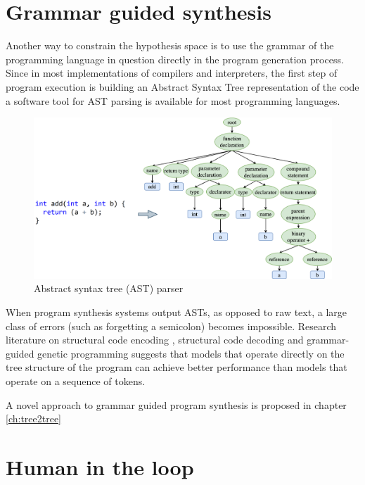 \newpage
\section{Grammar guided synthesis}
\label{sec:grammar-guided}

Another way to constrain the hypothesis space is to use the grammar of the programming language in question directly in the program generation process.
Since in most implementations of compilers and interpreters, the first step of program execution is building an Abstract Syntax Tree representation of the code a software tool for AST parsing is available for most programming languages.

\begin{figure}[H]
    \centering
    \includegraphics[width=\linewidth]{images/ast.png}
    \caption{Abstract syntax tree (AST) parser}
    \label{fig:ast-parser}
\end{figure}

When program synthesis systems  output ASTs, as opposed to raw text, a large class of errors (such as forgetting a semicolon) becomes impossible. 
Research literature on structural code encoding \cite{alon2019structural,zhang2015tree}, structural code decoding \cite{jiang2021ast,zhu2019grammarcnn} and grammar-guided genetic programming \cite{bunelLeveragingGrammarReinforcement2018, manriqueGrammarguidedGeneticProgramming2009, sobaniaChallengesProgramSynthesis2020a} suggests that models that operate directly on the tree structure of the program can achieve better performance than models that operate on a sequence of tokens.

A novel approach to grammar guided program synthesis is proposed in chapter \ref{ch:tree2tree}

\newpage
\section{Human in the loop}
\label{sec:human}

